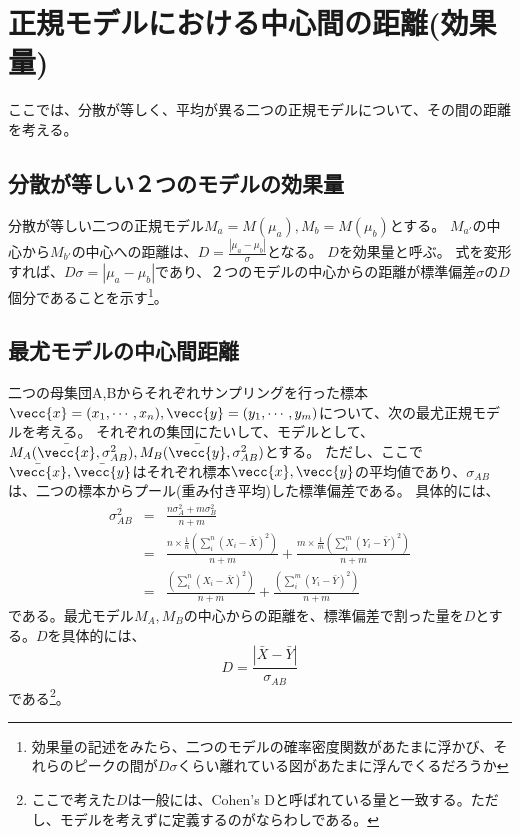\section{正規モデルにおける中心間の距離(効果量)}
ここでは、分散が等しく、平均が異る二つの正規モデルについて、その間の距離を考える。

\subsection{分散が等しい２つのモデルの効果量}
分散が等しい二つの正規モデル$M_a=M(\mu_a),M_b=M(\mu_b)$とする。
$M_{a'}$の中心から$M_{b'}$の中心への距離は、$D=\frac{|\mu_a-\mu_b|}{\sigma}$となる。
$D$を効果量と呼ぶ。
式を変形すれば、$D\sigma = |\mu_a-\mu_b|$であり、２つのモデルの中心からの距離が標準偏差$\sigma$の$D$個分であることを示す\footnote{効果量の記述をみたら、二つのモデルの確率密度関数があたまに浮かび、それらのピークの間が$D\sigma$くらい離れている図があたまに浮んでくるだろうか}。


\subsection{最尤モデルの中心間距離}
二つの母集団A,Bからそれぞれサンプリングを行った標本$\vecc{x}=(x_1,\cdots,x_n),\vecc{y}=(y_1,\cdots,y_m)$について、次の最尤正規モデルを考える。
それぞれの集団にたいして、モデルとして、$M_A(\bar{\vecc{x}},\sigma_{AB}^2),M_B(\bar{\vecc{y}},\sigma_{AB}^2)$とする。
ただし、ここで$\bar{\vecc{x}},\bar{\vecc{y}}$はそれぞれ標本$\vecc{x},\vecc{y}$の平均値であり、$\sigma_{AB}$は、二つの標本からプール(重み付き平均)した標準偏差である。
具体的には、
\begin{eqnarray*}
 \sigma_{AB}^2 &=& \frac{n\sigma_A^2+m\sigma_B^2 }{n+m}\\
 & = & \frac{n\times \frac{1}{n}(\sum_i^n (X_i -\bar{X})^2)  }{n+m} + \frac{m\times \frac{1}{m} (\sum_i^m (Y_i -\bar{Y})^2)  }{n+m} \\
 & = & \frac{(\sum_i^n (X_i -\bar{X})^2)  }{n+m} + \frac{(\sum_i^m (Y_i -\bar{Y})^2)  }{n+m}
\end{eqnarray*}
である。最尤モデル$M_A,M_B$の中心からの距離を、標準偏差で割った量を$D$とする。$D$を具体的には、
\begin{equation*}
 D = \frac{|\bar{X}-\bar{Y}|}{\sigma_{AB}}
\end{equation*}
である\footnote{ここで考えた$D$は一般には、Cohen's Dと呼ばれている量と一致する。ただし、モデルを考えずに定義するのがならわしである。}。%

